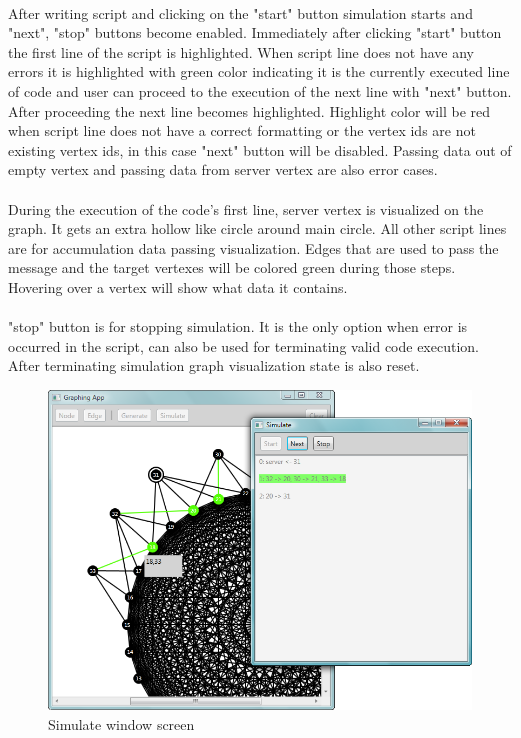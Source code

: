 \documentclass[a4paper,TexShade]{class}
\begin{document}
\paragraph{} After writing script and clicking on the "start" button simulation starts and "next", "stop" buttons become enabled. Immediately after clicking "start" button the first line of the script is highlighted. When script line does not have any errors it is highlighted with green color indicating it is the currently executed line of code and user can proceed to the execution of the next line with "next" button. After proceeding the next line becomes highlighted. Highlight color will be red when script line does not have a correct formatting or the vertex ids are not existing vertex ids, in this case "next" button will be disabled. Passing data out of empty vertex and passing data from server vertex are also error cases.

\paragraph{} During the execution of the code's first line, server vertex is visualized on the graph. It gets an extra hollow like circle around main circle. All other script lines are for accumulation data passing visualization. Edges that are used to pass the message and the target vertexes will be colored green during those steps. Hovering over a vertex will show what data it contains.

\paragraph{} "stop" button is for stopping simulation. It is the only option when error is occurred in the script, can also be used for terminating valid code execution. After terminating simulation graph visualization state is also reset.

\bigskip
\begin{figure}[h]
\centering
\caption{Simulate window screen} \label{fig:main3}
\includegraphics[width=\linewidth ,natwidth=785,natheight=593]{images/main3.png}
\end{figure}
\end{document}
